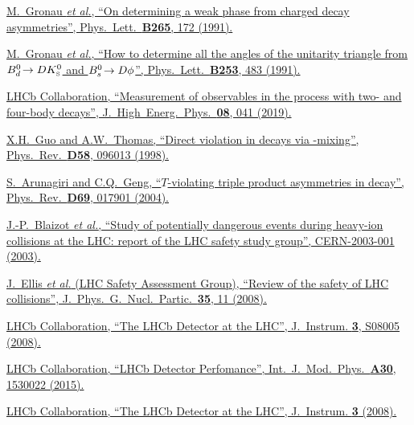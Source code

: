 {\begin{thebibliography}{xxx}
	\href{https://doi.org/10.1016/0370-2693(91)90034-N}{M.~Gronau \textit{et al.}, \enquote{On determining a weak phase from charged \PB decay asymmetries}, Phys.\ Lett.\ \textbf{B265}, 172 (1991).}

	\href{https://doi.org/10.1016/0370-2693(91)91756-L}{M.~Gronau \textit{et al.}, \enquote{How to determine all the angles of the unitarity triangle from $B_{d}^0\!\rightarrow D{{K}^0_{\mathrm{ \scriptscriptstyle S}}}$ and $B_{s}^0\!\rightarrow D\phi$}, Phys.\ Lett.\ \textbf{B253}, 483 (1991).}

	\href{https://doi.org/10.1007/JHEP08(2019)041}{LHCb Collaboration, \enquote{Measurement of \CP observables in the process \decay{\Bd}{\PD\Kstarz} with two- and four-body \PD decays}, J.\ High\ Energ.\ Phys.\ \textbf{08}, 041 (2019).}

	\href{https://doi.org/10.1103/PhysRevD.58.096013}{X.H.~Guo and A.W.~Thomas, \enquote{Direct \CP violation in \decay{\Lb}{\neutron(\Lz)\pip\pim} decays via \Prho-\Pomega mixing}, Phys.\ Rev.\ \textbf{D58}, 096013 (1998).}

	\href{https://doi.org/10.1103/PhysRevD.69.017901}{S.~Arunagiri and C.Q.~Geng, \enquote{$T$-violating triple product asymmetries in \decay{\Lb}{\Lz\pip\pim} decay}, Phys.\ Rev.\ \textbf{D69}, 017901 (2004).}

	\href{https://doi.org/10.5170/CERN-2003-001}{J.-P.~Blaizot \textit{et al.}, \enquote{Study of potentially dangerous events during heavy-ion collisions at the LHC: report of the LHC safety study group}, CERN-2003-001 (2003).}

	\href{https://doi.org/10.1088/0954-3899/35/11/115004}{J.~Ellis \textit{et al.} (LHC Safety Assessment Group), \enquote{Review of the safety of LHC collisions}, J.\ Phys.\ G.\ Nucl.\ Partic.\ \textbf{35}, 11 (2008).}

	\href{https://doi.org/10.1088/1748-0221/3/08/s08005}{LHCb Collaboration, \enquote{The LHCb Detector at the LHC}, J.\ Instrum. \textbf{3}, S08005 (2008).}

	\href{https://doi.org/10.1142/S0217751X15300227}{LHCb Collaboration, \enquote{LHCb Detector Perfomance}, Int.\ J.\ Mod.\ Phys.\ \textbf{A30}, 1530022 (2015).}

	\href{https://doi.org/10.1088/1748-0221/3/08/S08005}{LHCb Collaboration, \enquote{The LHCb Detector at the LHC}, J.\ Instrum. \textbf{3} (2008).}


\end{thebibliography}}

